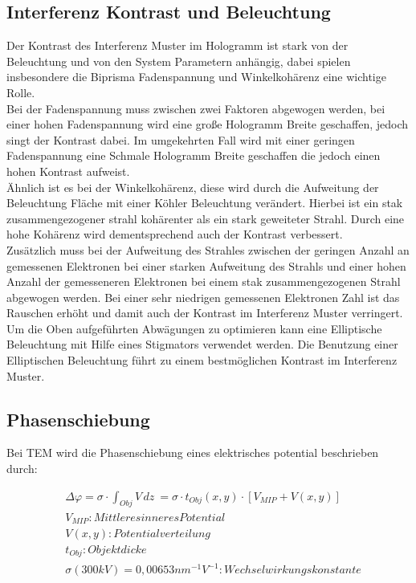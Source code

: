 \subsection{Interferenz Kontrast und Beleuchtung}
Der Kontrast des Interferenz Muster im Hologramm ist stark von der Beleuchtung und von den System Parametern anhängig, dabei spielen insbesondere die Biprisma Fadenspannung und Winkelkohärenz eine wichtige Rolle.\\
Bei der Fadenspannung muss zwischen zwei Faktoren abgewogen werden, bei einer hohen Fadenspannung wird eine große Hologramm Breite geschaffen, jedoch singt der Kontrast dabei. Im umgekehrten Fall wird mit einer geringen Fadenspannung eine Schmale Hologramm Breite geschaffen die jedoch einen hohen Kontrast aufweist. \\
Ähnlich ist es bei der Winkelkohärenz, diese wird durch die Aufweitung der Beleuchtung Fläche mit einer Köhler Beleuchtung verändert. Hierbei ist ein stak zusammengezogener strahl kohärenter als ein stark geweiteter Strahl. Durch eine hohe Kohärenz wird dementsprechend auch der Kontrast verbessert. \\
Zusätzlich muss bei der Aufweitung des Strahles zwischen der geringen Anzahl an gemessenen Elektronen bei einer starken Aufweitung des Strahls und einer hohen Anzahl der gemesseneren Elektronen bei einem stak zusammengezogenen Strahl abgewogen werden. Bei einer sehr niedrigen gemessenen Elektronen Zahl ist das Rauschen erhöht und damit auch der Kontrast im Interferenz Muster verringert. \\
Um die Oben aufgeführten Abwägungen zu optimieren kann eine Elliptische Beleuchtung mit Hilfe eines Stigmators verwendet werden. Die Benutzung einer Elliptischen Beleuchtung führt zu einem bestmöglichen Kontrast im Interferenz Muster.

\subsection{Phasenschiebung}
Bei TEM wird die Phasenschiebung eines elektrisches potential beschrieben durch:

\begin{equation}
\begin{split}
\label{eq:PhaseShift}
    & \Delta \varphi =\sigma \cdot \int_{Obj} V \,dz\ = \sigma \cdot t_{Obj} (x,y) \cdot [V_{MIP} + V(x,y)] \\
    & V_{MIP}: Mittleres inneres Potential \\
    & V(x,y): Potentialverteilung \\
    & t_{Obj}: Objektdicke \\
    & \sigma (300kV) = 0,00653 nm^{-1}V^{-1}: Wechselwirkungskonstante \\
    \end{split}
\end{equation}

